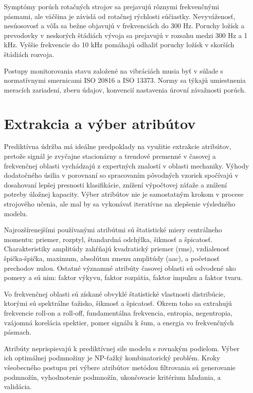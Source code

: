 Symptómy porúch rotačných strojov sa prejavujú rôznymi frekvenčnými pásmami, ale väčšina je závislá od rotačnej rýchlosti súčiastky. Nevyváženosť, nesúosovosť a vôľa sa bežne objavujú v frekvenciách do 300 Hz. Poruchy ložísk a prevodovky v neskorých štádiách vývoja sa prejavujú v rozsahu medzi 300 Hz a 1 kHz. Vyššie frekvencie do 10 kHz pomáhajú odhaliť poruchy ložísk v skorších štádiách rozvoja.

Postupy monitorovania stavu založené na vibráciách musia byť v súlade s normatívnymi smernicami ISO 20816 a ISO 13373. Normy sa týkajú umiestnenia meracích zariadení, zberu údajov, konvencií nastavenia úrovní závažnosti porúch. 

\section{Extrakcia a výber atribútov}
Prediktívna údržba má ideálne predpoklady na využitie extrakcie atribútov, pretože signál je zvyčajne stacionárny a trendové premenné v časovej a frekvenčnej oblasti vychádzajú z expertných znalostí v oblasti mechaniky. Výhody dodatočného úsilia v porovnaní so spracovaním pôvodných vzoriek spočívajú v dosahovaní lepšej presnosti klasifikácie, znížení výpočtovej záťaže a znížení potreby úložnej kapacity. Výber atribútov nie je samostatným krokom v procese strojového učenia, ale mal by sa vykonávať iteratívne na zlepšenie výsledného modelu.

Najrozšírenejšími používanými atribútmi sú štatistické miery centrálneho momentu: priemer, rozptyl, štandardná odchýlka, šikmosť a špicatosť. Charakteristiky amplitúdy zahŕňajú kvadratický priemer (rms), vzdialenosť špička-špička, maximum, absolútnu zmenu amplitúdy (aac), a početnosť prechodov nulou. Ostatné významné atribúty časovej oblasti sú odvodené ako pomery a sú nim: faktor výkyvu, faktor rozpätia, faktor impulzu a faktor tvaru.  

Vo frekvenčnej oblasti sú získané obvyklé štatistické vlastnosti distribúcie, ktorými sú spektrálne ťažisko, šikmosť a špicatosť. Okrem toho sa extrahujú frekvencie roll-on a roll-off, fundamentálna frekvencia, entropia, negentropia, vzájomná korelácia spektier, pomer signálu k šum, a energia vo frekvenčných pásmach.

Atribúty neprispievajú k prediktívnej sile modelu s rovnakým podielom. Výber ich optimálnej podmnožiny je NP-ťažký kombinatorický problém. Kroky všeobecného postupu pri výbere atribútov metódou filtrovania sú generovanie podmnožín, vyhodnotenie podmnožín, ukončovacie kritérium hľadania, a validácia.

